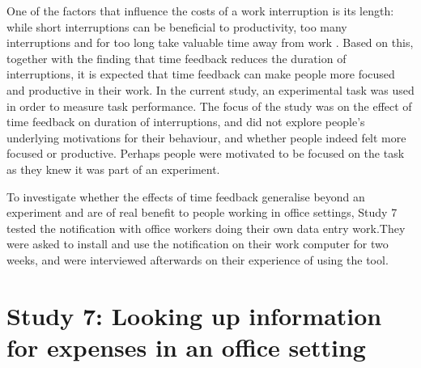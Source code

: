 One of the factors that influence the costs of a work interruption is its length: while short interruptions can be beneficial to productivity, too many interruptions and for too long take valuable time away from work \citep{Mark2018}. Based on this, together with the finding that time feedback reduces the duration of interruptions, it is expected that time feedback can make people more focused and productive in their work.  In the current study, an experimental task was used in order to measure task performance. The focus of the study was on the effect of time feedback on duration of interruptions, and did not explore people's underlying motivations for their behaviour, and whether people indeed felt more focused or productive. Perhaps people were motivated to be focused on the task as they knew it was part of an experiment.

To investigate whether the effects of time feedback generalise beyond an experiment and are of real benefit to people working in office settings, Study 7 tested the notification with office workers doing their own data entry work.They were asked to install and use the notification on their work computer for two weeks, and were interviewed afterwards on their experience of using the tool.


\section{Study 7: Looking up information for expenses in an office setting}
